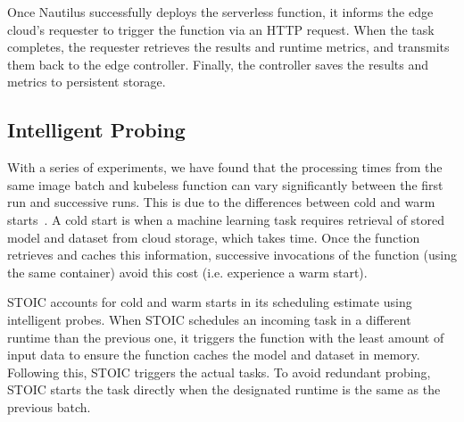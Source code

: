 Once Nautilus successfully deploys the serverless function, it informs the edge cloud's requester to trigger the function via an HTTP request. When the task completes, the requester retrieves the results and runtime metrics, and transmits them back to the edge controller. Finally, the controller saves the results and metrics to persistent storage. 
 
 \subsection{Intelligent Probing}
 With a series of experiments, we have found that the processing times from the same image batch and kubeless function can vary significantly between the first run and successive runs. This is due to the differences between cold and warm starts~\cite{ref:coldstart}.  A cold start is when a machine learning task requires retrieval of stored model and dataset from cloud storage, which takes time. Once the function retrieves and caches this information, successive invocations of the function (using the same container) avoid this cost (i.e. experience a warm start). 

STOIC accounts for cold and warm starts in its scheduling estimate using intelligent probes. When STOIC schedules an incoming task in a different runtime than the previous one, it triggers the function with the least amount of input data to ensure the function caches the model and dataset in memory. Following this, STOIC triggers the actual tasks. To avoid redundant probing, STOIC starts the task directly when the designated runtime is the same as the previous batch.
